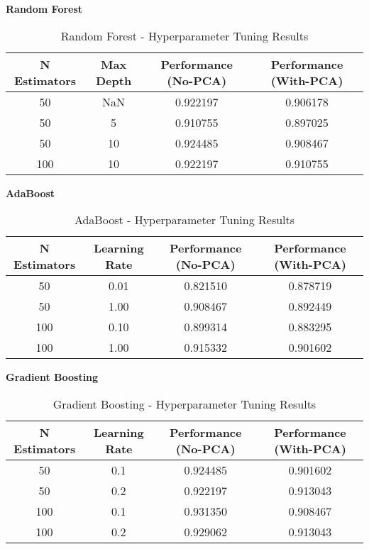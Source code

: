 \documentclass[11pt]{article}
\begin{document}
\vspace{0.7cm}
\textbf{Random Forest}
\begin{table}[H]
\centering
\caption{Random Forest - Hyperparameter Tuning Results}
\begin{tabular}{|c|c|c|c|} 
\hline
\textbf{N Estimators} & \textbf{Max Depth} & \textbf{Performance (No-PCA)} & \textbf{Performance (With-PCA)} \\
\hline
50  & NaN  & 0.922197 & 0.906178 \\
50  & 5    & 0.910755 & 0.897025 \\
50  & 10   & 0.924485 & 0.908467 \\ 
100 & 10   & 0.922197 & 0.910755 \\
\hline
\end{tabular}
\end{table}

\vspace{0.7cm}
\textbf{AdaBoost}
\begin{table}[H]
\centering
\caption{AdaBoost - Hyperparameter Tuning Results}
\begin{tabular}{|c|c|c|c|} 
\hline
\textbf{N Estimators} & \textbf{Learning Rate} & \textbf{Performance (No-PCA)} & \textbf{Performance (With-PCA)} \\
\hline
50  & 0.01 & 0.821510 & 0.878719 \\
50  & 1.00 & 0.908467 & 0.892449 \\
100 & 0.10 & 0.899314 & 0.883295 \\
100 & 1.00 & 0.915332 & 0.901602 \\
\hline
\end{tabular}
\end{table}

\vspace{0.7cm}
\textbf{Gradient Boosting}
\begin{table}[H]
\centering
\caption{Gradient Boosting - Hyperparameter Tuning Results}
\begin{tabular}{|c|c|c|c|} 
\hline
\textbf{N Estimators} & \textbf{Learning Rate} & \textbf{Performance (No-PCA)} & \textbf{Performance (With-PCA)} \\
\hline
50  & 0.1 & 0.924485 & 0.901602 \\
50  & 0.2 & 0.922197 & 0.913043 \\
100 & 0.1 & 0.931350 & 0.908467 \\ 
100 & 0.2 & 0.929062 & 0.913043 \\
\hline
\end{tabular}
\end{table}
\end{document}
